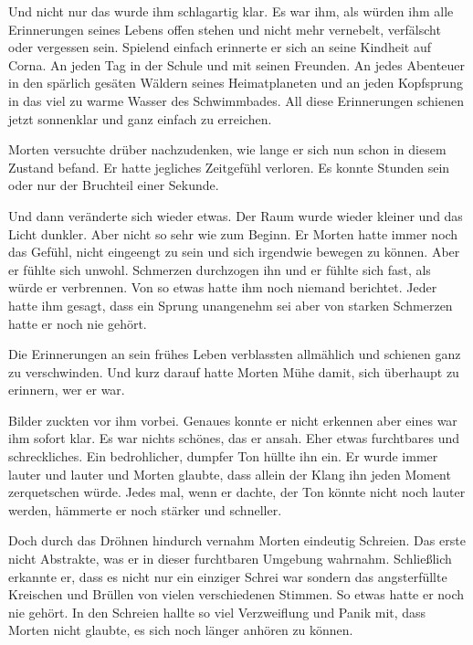 \par

Und nicht nur das wurde ihm schlagartig klar. Es war ihm, als würden ihm alle Erinnerungen seines Lebens offen stehen und nicht mehr vernebelt, verfälscht oder vergessen sein. Spielend einfach erinnerte er sich an seine Kindheit auf Corna. An jeden Tag in der Schule und mit seinen Freunden. An jedes Abenteuer in den spärlich gesäten Wäldern seines Heimatplaneten und an jeden Kopfsprung in das viel zu warme Wasser des Schwimmbades. All diese Erinnerungen schienen jetzt sonnenklar und ganz einfach zu erreichen.

\par

Morten versuchte drüber nachzudenken, wie lange er sich nun schon in diesem Zustand befand. Er hatte jegliches Zeitgefühl verloren. Es konnte Stunden sein oder nur der Bruchteil einer Sekunde.

\par

Und dann veränderte sich wieder etwas. Der Raum wurde wieder kleiner und das Licht dunkler. Aber nicht so sehr wie zum Beginn. Er Morten hatte immer noch das Gefühl, nicht eingeengt zu sein und sich irgendwie bewegen zu können. Aber er fühlte sich unwohl. Schmerzen durchzogen ihn und er fühlte sich fast, als würde er verbrennen. Von so etwas hatte ihm noch niemand berichtet. Jeder hatte ihm gesagt, dass ein Sprung unangenehm sei aber von starken Schmerzen hatte er noch nie gehört.

\par

Die Erinnerungen an sein frühes Leben verblassten allmählich und schienen ganz zu verschwinden. Und kurz darauf hatte Morten Mühe damit, sich überhaupt zu erinnern, wer er war.

\par

Bilder zuckten vor ihm vorbei. Genaues konnte er nicht erkennen aber eines war ihm sofort klar. Es war nichts schönes, das er ansah. Eher etwas furchtbares und schreckliches. Ein bedrohlicher, dumpfer Ton hüllte ihn ein. Er wurde immer lauter und lauter und Morten glaubte, dass allein der Klang ihn jeden Moment zerquetschen würde. Jedes mal, wenn er dachte, der Ton könnte nicht noch lauter werden, hämmerte er noch stärker und schneller.

\par

Doch durch das Dröhnen hindurch vernahm Morten eindeutig Schreien. Das erste nicht Abstrakte, was er in dieser furchtbaren Umgebung wahrnahm. Schließlich erkannte er, dass es nicht nur ein einziger Schrei war sondern das angsterfüllte Kreischen und Brüllen von vielen verschiedenen Stimmen. So etwas hatte er noch nie gehört. In den Schreien hallte so viel Verzweiflung und Panik mit, dass Morten nicht glaubte, es sich noch länger anhören zu können.

